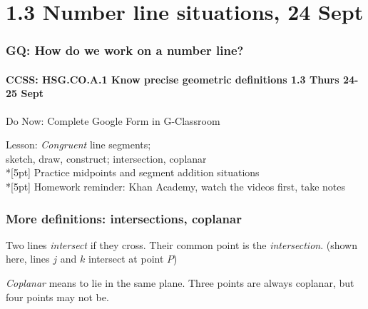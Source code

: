 \documentclass{beamer}
\begin{document}
  \section{1.3 Number line situations, 24 Sept}
  \frame
  {
    \frametitle{GQ: How do we work on a number line?}
    \framesubtitle{CCSS: HSG.CO.A.1 Know precise geometric definitions  \hfill \alert{1.3 Thurs 24-25 Sept}}
  
    \begin{block}{Do Now: Complete Google Form in G-Classroom}
    \end{block}
    Lesson: \emph{Congruent} line segments; 
    \\ sketch, draw, construct; intersection, coplanar \\*[5pt]
    Practice midpoints and segment addition situations \\*[5pt]
    Homework reminder: Khan Academy, watch the videos first, take notes
  }

  \frame
  {
    \frametitle{More definitions: intersections, coplanar}
    Two lines \emph{intersect} if they cross. Their common point is the \emph{intersection}. 
    (shown here, lines $j$ and $k$ intersect at point $P$)
    \begin{center}
      \end{center}
      \emph{Coplanar} means to lie in the same plane. Three points are always coplanar, but four points may not be. \\[0.15in]
      \begin{center}
    \end{center}
  }
\end{document}
